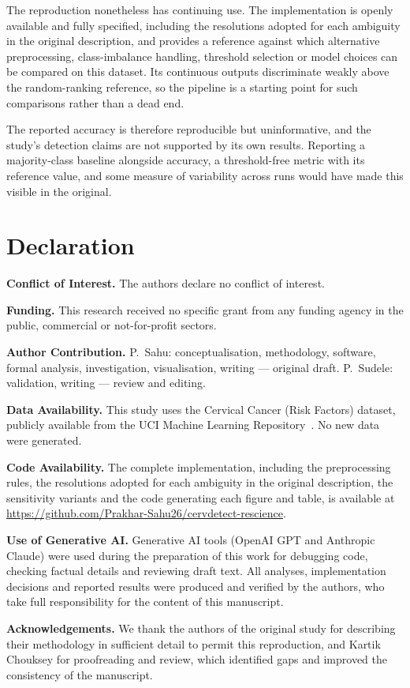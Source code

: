 The reproduction nonetheless has continuing use. The implementation is openly
available and fully specified, including the resolutions adopted for each
ambiguity in the original description, and provides a reference against which
alternative preprocessing, class-imbalance handling, threshold selection or
model choices can be compared on this dataset. Its continuous outputs
discriminate weakly above the random-ranking reference, so the pipeline is a
starting point for such comparisons rather than a dead end.

The reported accuracy is therefore reproducible but uninformative, and the
study's detection claims are not supported by its own results. Reporting a
majority-class baseline alongside accuracy, a threshold-free metric with its
reference value, and some measure of variability across runs would have made
this visible in the original.

\section*{Declaration}

\noindent\textbf{Conflict of Interest.} The authors declare no conflict of
interest.

\vspace{0.5em}
\noindent\textbf{Funding.} This research received no specific grant from any
funding agency in the public, commercial or not-for-profit sectors.

\vspace{0.5em}
\noindent\textbf{Author Contribution.} P.~Sahu: conceptualisation,
methodology, software, formal analysis, investigation, visualisation, writing
--- original draft. P.~Sudele: validation, writing --- review and editing.

\vspace{0.5em}
\noindent\textbf{Data Availability.} This study uses the Cervical Cancer
(Risk Factors) dataset, publicly available from the UCI Machine Learning
Repository~\cite{fernandes2017}. No new data were generated.

\vspace{0.5em}
\noindent\textbf{Code Availability.} The complete implementation, including
the preprocessing rules, the resolutions adopted for each ambiguity in the
original description, the sensitivity variants and the code generating each
figure and table, is available at
\url{https://github.com/Prakhar-Sahu26/cervdetect-rescience}.

\vspace{0.5em}
\noindent\textbf{Use of Generative AI.} Generative AI tools (OpenAI GPT and
Anthropic Claude) were used during the preparation of this work for debugging
code, checking factual details and reviewing draft text. All analyses,
implementation decisions and reported results were produced and verified by the
authors, who take full responsibility for the content of this manuscript.

\vspace{0.5em}
\noindent\textbf{Acknowledgements.} We thank the authors of the original study
for describing their methodology in sufficient detail to permit this
reproduction, and Kartik Chouksey for proofreading and review, which identified
gaps and improved the consistency of the manuscript.
